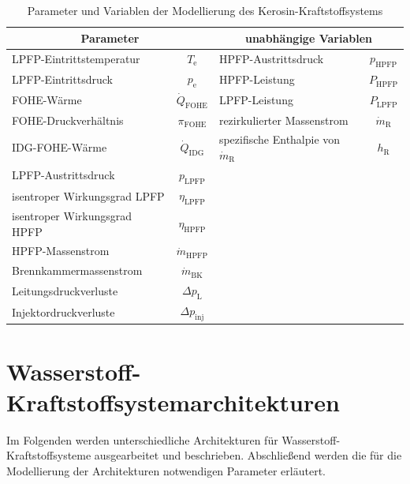 \begin{table}[ht]
    \centering
	\caption{Parameter und Variablen der Modellierung des  Kerosin-Kraftstoffsystems}
	\begin{tabular} {|l|c|l|c|} \hline%
		\multicolumn{2}{|c}{Parameter} & \multicolumn{2}{|c|}{unabhängige Variablen}\\ \hline\hline%
        LPFP-Eintrittstemperatur & $T_\mathrm{e}$ & HPFP-Austrittsdruck & $p_{\mathrm{HPFP}}$ \\ \hline
        LPFP-Eintrittsdruck & $p_\mathrm{e}$ & HPFP-Leistung & $P_{\mathrm{HPFP}}$ \\ \hline
        FOHE-Wärme & $\dot{Q}_{\mathrm{FOHE}}$ & LPFP-Leistung & $P_{\mathrm{LPFP}}$ \\ \hline
        FOHE-Druckverhältnis & $\pi_{\mathrm{FOHE}}$ & rezirkulierter Massenstrom & $\dot{m}_\mathrm{R}$ \\ \hline
        IDG-FOHE-Wärme  & $\dot{Q}_{\mathrm{IDG}}$ & spezifische Enthalpie von $\dot{m}_\mathrm{R}$ & $h_\mathrm{R}$                 \\ \hline
        LPFP-Austrittsdruck & $p_{\mathrm{LPFP}}$& \multicolumn{2}{c|}{}\\ \hline
        isentroper Wirkungsgrad LPFP & $\eta_{\mathrm{LPFP}}$& \multicolumn{2}{c|}{}\\ \hline
        isentroper Wirkungsgrad HPFP & $\eta_{\mathrm{HPFP}}$& \multicolumn{2}{c|}{}\\ \hline
        HPFP-Massenstrom & $\dot{m}_{\mathrm{HPFP}}$& \multicolumn{2}{c|}{}\\ \hline
        Brennkammermassenstrom & $\dot{m}_\mathrm{BK}$& \multicolumn{2}{c|}{}\\ \hline
        Leitungsdruckverluste & $\Delta p_{\mathrm{L}}$& \multicolumn{2}{c|}{}\\ \hline
        Injektordruckverluste & $\Delta p_{\mathrm{inj}}$& \multicolumn{2}{c|}{}\\ \hline
	\end{tabular}	
    \label{Tab:referenz_params}%
\end{table}
\FloatBarrier 

\section{Wasserstoff-Kraftstoffsystemarchitekturen}

Im Folgenden werden unterschiedliche Architekturen für Wasserstoff-Kraftstoffsysteme ausgearbeitet und beschrieben. Abschließend werden die für die Modellierung der Architekturen notwendigen Parameter erläutert. 

